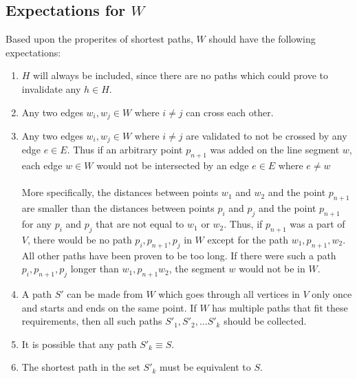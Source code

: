 \documentclass[12pt]{article}
\begin{document}
\subsection{Expectations for $W$}\label{subsec:exp_w}
Based upon the properites of shortest paths, $W$ should have the following expectations:
\begin{enumerate}
\item $H$ will always be included, since there are no paths which could prove to
invalidate any $h \in H$.
\item Any two edges $w_i,w_j \in W$ where $i \neq j$ can cross each other.
\item Any two edges $w_i,w_j \in W$ where $i \neq j$ are validated to
not be crossed by any edge $e \in E$.
Thus if an arbitrary point $p_{n+1}$ was added on the line segment $w$,
each edge $w \in W$ would not be intersected by an edge $e \in E$ where $e \neq w$
\\\\
More specifically, the distances between points
$w_1$ and $w_2$ and the point $p_{n+1}$
are smaller than the distances between points
$p_i$ and $p_j$ and the point $p_{n+1}$ for any $p_i$ and $p_j$
that are not equal to $w_1$ or $w_2$.
Thus, if $p_{n+1}$ was a part of $V$, there would be no path $p_i,p_{n+1},p_j$
in $W$
except for the path $w_1,p_{n+1},w_2$.
All other paths have been proven to be too long.
If there were such a path $p_i,p_{n+1},p_j$ longer than $w_1,p_{n+1}w_2$,
the segment $w$ would not be in $W$.
\item A path $S'$ can be made from $W$ which goes through all vertices in $V$ only once
and starts and ends on the same point.
If $W$ has multiple paths that fit these requirements, then all such paths
$S'_1, S'_2, ... S'_k$ should be collected.
\item It is possible that any path $S'_k \equiv S$.
\item The shortest path in the set $S'_k$ must be equivalent to $S$.
\end{enumerate}
\end{document}
